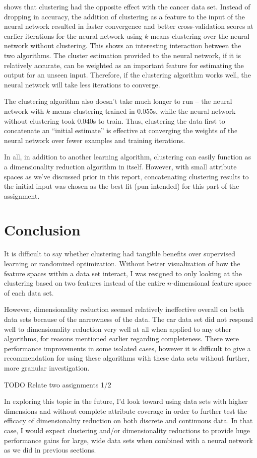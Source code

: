 \documentclass{article}
\begin{document}
     shows that clustering had the opposite effect with the cancer data set. Instead of dropping in accuracy, the addition of clustering as a feature to the input of the neural network resulted in faster convergence and better cross-validation scores at earlier iterations for the neural network using $k$-means clustering over the neural network without clustering. This shows an interesting interaction between the two algorithms. The cluster estimation provided to the neural network, if it is relatively accurate, can be weighted as an important feature for estimating the output for an unseen input. Therefore, if the clustering algorithm works well, the neural network will take less iterations to converge.

    The clustering algorithm also doesn't take much longer to run -- the neural network with $k$-means clustering trained in 0.055s, while the neural network without clustering took 0.040s to train. Thus, clustering the data first to concatenate an ``initial estimate'' is effective at converging the weights of the neural network over fewer examples and training iterations.

    In all, in addition to another learning algorithm, clustering can easily function as a dimensionality reduction algorithm in itself. However, with small attribute spaces as we've discussed prior in this report, concatenating clustering results to the initial input was chosen as the best fit (pun intended) for this part of the assignment.

  \section{Conclusion}
    It is difficult to say whether clustering had tangible benefits over supervised learning or randomized optimization. Without better visualization of how the feature spaces within a data set interact, I was resigned to only looking at the clustering based on two features instead of the entire $n$-dimensional feature space of each data set.

    However, dimensionality reduction seemed relatively ineffective overall on both data sets because of the narrowness of the data. The car data set did not respond well to dimensionality reduction very well at all when applied to any other algorithms, for reasons mentioned earlier regarding completeness. There were performance improvements in some isolated cases, however it is difficult to give a recommendation for using these algorithms with these data sets without further, more granular investigation.

    TODO Relate two assignments 1/2

    In exploring this topic in the future, I'd look toward using data sets with higher dimensions and without complete attribute coverage in order to further test the efficacy of dimensionality reduction on both discrete and continuous data. In that case, I would expect clustering and/or dimensionality reductions to provide huge performance gains for large, wide data sets when combined with a neural network as we did in previous sections.
\end{document}
